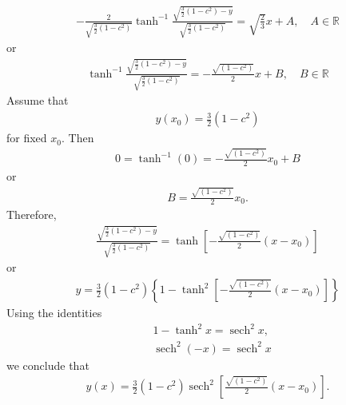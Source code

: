 \documentclass[12pt,reqno]{amsart}
\numberwithin{equation}{section}  %
\newcommand{\rr}{\mathbb{R}}
\def\sech{\operatorname{sech}}
\begin{document}
%
%
\begin{equation*}
\begin{split}
  -\frac{2}{\sqrt{\frac{3}{2}(1-c^{2})}} \tanh^{-1}
  \frac{\sqrt{\frac{3}{2}(1-c^{2}) - y}}{\sqrt{\frac{3}{2}(1-c^{2})}} =
  \sqrt{\frac{2}{3}}x + A, \quad A \in \rr
\end{split}
\end{equation*}
%
%
or
\begin{equation*}
\begin{split}
  \tanh^{-1}
  \frac{\sqrt{\frac{3}{2}(1-c^{2}) - y}}{\sqrt{\frac{3}{2}(1-c^{2})}} =
  - \frac{\sqrt{(1-c^{2})}}{2}x + B, \quad B \in \rr
\end{split}
\end{equation*}
%
Assume that
%
%
\begin{equation*}
\begin{split}
  y(x_{0}) = \frac{3}{2}(1-c^{2})
\end{split}
\end{equation*}
%
%
for fixed $x_{0}$. Then
%
%
\begin{equation*}
\begin{split}
  0 = \tanh^{-1}(0) = - \frac{\sqrt{(1-c^{2})}}{2}x_{0} + B
\end{split}
\end{equation*}
%
%
or
%
%
\begin{equation*}
\begin{split}
B = \frac{\sqrt{(1-c^{2})}}{2}x_{0}.
\end{split}
\end{equation*}
%
%
Therefore,
%
%
\begin{equation*}
\begin{split}
  \frac{\sqrt{\frac{3}{2}(1-c^{2}) - y}}{\sqrt{\frac{3}{2}(1-c^{2})}} =
  \tanh \left [- \frac{\sqrt{(1-c^{2})}}{2}(x -x_{0}) \right ] 
\end{split}
\end{equation*}
%
%
or
%
%
%
\begin{equation*}
\begin{split}
  y = \frac{3}{2}(1-c^{2}) \left \{ 1 - \tanh^{2} \left [- \frac{\sqrt{(1-c^{2})}}{2}(x -x_{0})
  \right ] \right \}
  \end{split}
\end{equation*}
%
%
Using the identities
%
%
\begin{equation*}
\begin{split}
  & 1 - \tanh^{2}x = \sech^{2}x,
  \\
  & \sech^{2}(-x) = \sech^{2}x
\end{split}
\end{equation*}
%
we conclude that
%
%
\begin{equation*}
\begin{split}
  y(x) = \frac{3}{2}(1-c^{2}) \sech^{2} \left [\frac{\sqrt{(1-c^{2})}}{2}(x -x_{0})
  \right ]. 
  \end{split}
\end{equation*}
%
%
%
%
%
%
%
%
%
\end{document}
